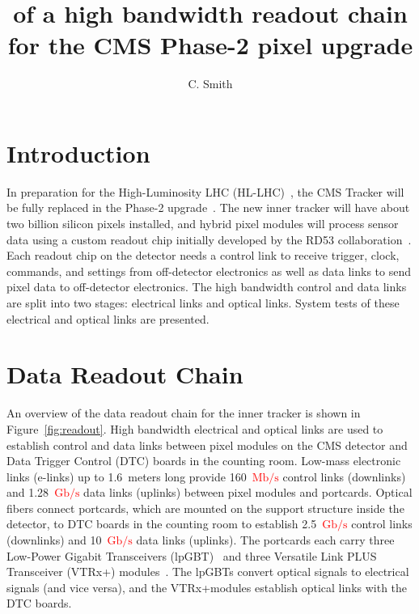 \documentclass[a4paper,11pt]{article}
\title{\red{Characterization} of a high bandwidth readout chain for the CMS Phase-2 pixel upgrade}
\author{C. Smith}
\affiliation{The University of Kansas,\\Lawrence, Kansas 66045, USA}
\newcommand{\vtrxp}{VTRx+}
\newcommand{\fig}{Figure}
\newcommand{\mbps}{\ensuremath{\mathrm{Mb}/\mathrm{s}}\xspace}
\newcommand{\gbps}{\ensuremath{\mathrm{Gb}/\mathrm{s}}\xspace}
\newcommand{\red}{\textcolor{red}}
\begin{document}
\maketitle

\flushbottom


\section{Introduction}
\label{sec:introduction}

In preparation for the High-Luminosity LHC (HL-LHC)~\cite{ref:hllhc}, the CMS Tracker will be fully replaced in the Phase-2 upgrade~\cite{ref:cms,ref:tdr,ref:orfanelli}.
The new inner tracker will have about two billion silicon pixels installed,
and hybrid pixel modules will process sensor data using a custom readout chip initially developed by the RD53 collaboration~\cite{ref:rd53}.
Each readout chip on the detector needs a control link to receive trigger, clock, commands, and settings from off-detector electronics as well as data links to send pixel data to off-detector electronics.
The high bandwidth control and data links are split into two stages: electrical links and optical links.
System tests of these electrical and optical links are presented.

\section{Data Readout Chain}
\label{sec:readout}

An overview of the data readout chain for the inner tracker is shown in \fig~\ref{fig:readout}.
High bandwidth electrical and optical links are used to establish control and data links between pixel modules on the CMS detector and Data Trigger Control (DTC) boards in the counting room.
Low-mass electronic links (e-links) up to 1.6~meters long provide 160~\red{\mbps} control links (downlinks) and 1.28~\red{\gbps} data links (uplinks) between pixel modules and portcards.
Optical fibers connect portcards, which are mounted on the support structure inside the detector, to DTC boards in the counting room to establish 2.5~\red{\gbps} control links (downlinks) and 10~\red{\gbps} data links (uplinks).
The portcards each carry three Low-Power Gigabit Transceivers (lpGBT)~\cite{ref:lpgbt_1} and three Versatile Link PLUS Transceiver (\vtrxp) modules~\cite{ref:vtrxp}.
The lpGBTs convert optical signals to electrical signals (and vice versa), and the \vtrxp\space modules establish optical links with the DTC boards.
\end{document}
